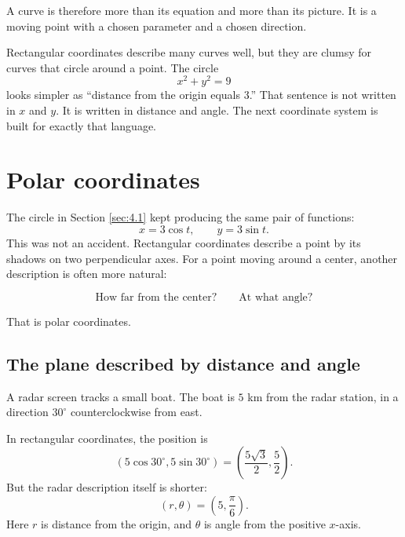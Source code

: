 A curve is therefore more than its equation and more than its picture.  It is a moving
point with a chosen parameter and a chosen direction.

Rectangular coordinates describe many curves well, but they are clumsy for curves
that circle around a point.  The circle
\[
    x^2+y^2=9
\]
looks simpler as ``distance from the origin equals \(3\).''  That sentence is not written
in \(x\) and \(y\).  It is written in distance and angle.  The next coordinate system is
built for exactly that language.

\section{Polar coordinates}
\label{sec:4.2}

The circle in Section \ref{sec:4.1} kept producing the same pair of functions:
\[
    x=3\cos t,\qquad y=3\sin t.
\]
This was not an accident.  Rectangular coordinates describe a point by its shadows on
two perpendicular axes.  For a point moving around a center, another description is often
more natural:

\[
    \text{How far from the center?}
    \qquad
    \text{At what angle?}
\]

That is polar coordinates.

\subsection{The plane described by distance and angle}

A radar screen tracks a small boat.  The boat is \(5\) km from the radar station, in a
direction \(30^\circ\) counterclockwise from east.

In rectangular coordinates, the position is
\[
    \left(5\cos 30^\circ,5\sin 30^\circ\right)
    =
    \left(\frac{5\sqrt3}{2},\frac52\right).
\]
But the radar description itself is shorter:
\[
    (r,\theta)=\left(5,\frac{\pi}{6}\right).
\]
Here \(r\) is distance from the origin, and \(\theta\) is angle from the positive
\(x\)-axis.

